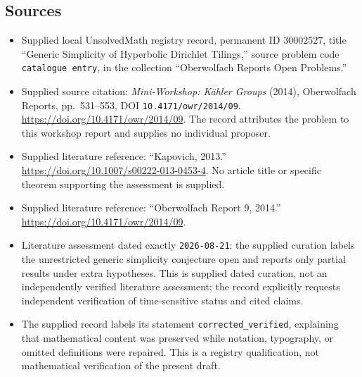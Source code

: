 \documentclass[11pt]{article}
\begin{document}
\subsection{Sources}
\begin{itemize}
\item Supplied local UnsolvedMath registry record, permanent ID \(30002527\), title ``Generic Simplicity of Hyperbolic Dirichlet Tilings,'' source problem code \texttt{catalogue entry}, in the collection ``Oberwolfach Reports Open Problems.''
\item Supplied source citation: \emph{Mini-Workshop: K\"ahler Groups} (2014), Oberwolfach Reports, pp.~531--553, DOI \texttt{10.4171/owr/2014/09}. \url{https://doi.org/10.4171/owr/2014/09}. The record attributes the problem to this workshop report and supplies no individual proposer.
\item Supplied literature reference: ``Kapovich, 2013.'' \url{https://doi.org/10.1007/s00222-013-0453-4}. No article title or specific theorem supporting the assessment is supplied.
\item Supplied literature reference: ``Oberwolfach Report 9, 2014.'' \url{https://doi.org/10.4171/owr/2014/09}.
\item Literature assessment dated exactly \texttt{2026-08-21}: the supplied curation labels the unrestricted generic simplicity conjecture open and reports only partial results under extra hypotheses. This is supplied dated curation, not an independently verified literature assessment; the record explicitly requests independent verification of time-sensitive status and cited claims.
\item The supplied record labels its statement \texttt{corrected\_verified}, explaining that mathematical content was preserved while notation, typography, or omitted definitions were repaired. This is a registry qualification, not mathematical verification of the present draft.
\end{itemize}
\end{document}
